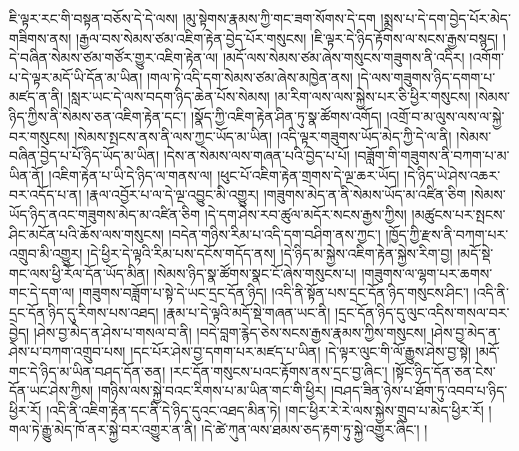 ཇི་ལྟར་རང་གི་བསྟན་བཅོས་དེ་དེ་ལས། །མུ་སྟེགས་རྣམས་ཀྱི་གང་ཟག་སོགས་དེ་དག །སྨྲས་པ་དེ་དག་བྱེད་པོར་མེད་གཟིགས་ནས། །རྒྱལ་བས་སེམས་ཙམ་འཇིག་རྟེན་བྱེད་པོར་གསུངས། །ཇི་ལྟར་དེ་ཉིད་རྟོགས་ལ་སངས་རྒྱས་བསྙད། །དེ་བཞིན་སེམས་ཙམ་གཙོར་གྱུར་འཇིག་རྟེན་ལ། །མདོ་ལས་སེམས་ཙམ་ཞེས་གསུངས་གཟུགས་ནི་འདིར། །འགོག་པ་དེ་ལྟར་མདོ་ཡི་དོན་མ་ཡིན། །གལ་ཏེ་འདི་དག་སེམས་ཙམ་ཞེས་མཁྱེན་ནས། །དེ་ལས་གཟུགས་ཉིད་དགག་པ་མཛད་ན་ནི། །སླར་ཡང་དེ་ལས་བདག་ཉིད་ཆེན་པོས་སེམས། །མ་རིག་ལས་ལས་སྐྱེས་པར་ཅི་ཕྱིར་གསུངས། །སེམས་ཉིད་ཀྱིས་ནི་སེམས་ཅན་འཇིག་རྟེན་དང་། །སྣོད་ཀྱི་འཇིག་རྟེན་ཤིན་ཏུ་སྣ་ཚོགས་འགོད། །འགྲོ་བ་མ་ལུས་ལས་ལ་སྐྱེ་བར་གསུངས། །སེམས་སྤངས་ནས་ནི་ལས་ཀྱང་ཡོད་མ་ཡིན། །འདི་ལྟར་གཟུགས་ཡོད་མེད་ཀྱི་དེ་ལ་ནི། །སེམས་བཞིན་བྱེད་པ་པོ་ཉིད་ཡོད་མ་ཡིན། །དེས་ན་སེམས་ལས་གཞན་པའི་བྱེད་པ་པོ། །བཟློག་གི་གཟུགས་ནི་བཀག་པ་མ་ཡིན་ནོ། །འཇིག་རྟེན་པ་ཡི་དེ་ཉིད་ལ་གནས་ལ། །ཕུང་པོ་འཇིག་རྟེན་གྲགས་དེ་ལྔ་ཆར་ཡོད། །དེ་ཉིད་ཡེ་ཤེས་འཆར་བར་འདོད་པ་ན། །རྣལ་འབྱོར་པ་ལ་དེ་ལྔ་འབྱུང་མི་འགྱུར། །གཟུགས་མེད་ན་ནི་སེམས་ཡོད་མ་འཛིན་ཅིག །སེམས་ཡོད་ཉིད་ནའང་གཟུགས་མེད་མ་འཛིན་ཅིག །དེ་དག་ཤེས་རབ་ཚུལ་མདོར་སངས་རྒྱས་ཀྱིས། །མཚུངས་པར་སྤངས་ཤིང་མངོན་པའི་ཆོས་ལས་གསུངས། །བདེན་གཉིས་རིམ་པ་འདི་དག་བཤིག་ནས་ཀྱང་། །ཁྱོད་ཀྱི་རྫས་ནི་བཀག་པར་འགྲུབ་མི་འགྱུར། །དེ་ཕྱིར་དེ་ལྟའི་རིམ་པས་དངོས་གདོད་ནས། །དེ་ཉིད་མ་སྐྱེས་འཇིག་རྟེན་སྐྱེས་རིག་བྱ། །མདོ་སྡེ་གང་ལས་ཕྱི་རོལ་དོན་ཡོད་མིན། །སེམས་ཉིད་སྣ་ཚོགས་སྣང་ངོ་ཞེས་གསུངས་པ། །གཟུགས་ལ་ལྷག་པར་ཆགས་གང་དེ་དག་ལ། །གཟུགས་བཟློག་པ་སྟེ་དེ་ཡང་དྲང་དོན་ཉིད། །འདི་ནི་སྟོན་པས་དྲང་དོན་ཉིད་གསུངས་ཤིང་། །འདི་ནི་དྲང་དོན་ཉིད་དུ་རིགས་པས་འཐད། །རྣམ་པ་དེ་ལྟའི་མདོ་སྡེ་གཞན་ཡང་ནི། །དྲང་དོན་ཉིད་དུ་ལུང་འདིས་གསལ་བར་བྱེད། །ཤེས་བྱ་མེད་ན་ཤེས་པ་གསལ་བ་ནི། །བདེ་བླག་རྙེད་ཅེས་སངས་རྒྱས་རྣམས་ཀྱིས་གསུངས། །ཤེས་བྱ་མེད་ན་ཤེས་པ་བཀག་འགྲུབ་པས། །དང་པོར་ཤེས་བྱ་དགག་པར་མཛད་པ་ཡིན། །དེ་ལྟར་ལུང་གི་ལོ་རྒྱུས་ཤེས་བྱ་སྟེ། །མདོ་གང་དེ་ཉིད་མ་ཡིན་བཤད་དོན་ཅན། །རང་དོན་གསུངས་པའང་རྟོགས་ནས་དྲང་བྱ་ཞིང་། །སྟོང་ཉིད་དོན་ཅན་ངེས་དོན་ཡང་ཤེས་ཀྱིས། །གཉིས་ལས་སྐྱེ་བའང་རིགས་པ་མ་ཡིན་གང་གི་ཕྱིར། །བཤད་ཟིན་ཉེས་པ་ཐོག་ཏུ་འབབ་པ་ཉིད་ཕྱིར་རོ། །འདི་ནི་འཇིག་རྟེན་དང་ནི་དེ་ཉིད་དུའང་འཐད་མིན་ཏེ། །གང་ཕྱིར་རེ་རེ་ལས་སྐྱེས་གྲུབ་པ་མེད་ཕྱིར་རོ། །གལ་ཏེ་རྒྱུ་མེད་ཁོ་ནར་སྐྱེ་བར་འགྱུར་ན་ནི། །དེ་ཚེ་ཀུན་ལས་ཐམས་ཅད་རྟག་ཏུ་སྐྱེ་འགྱུར་ཞིང་། །
